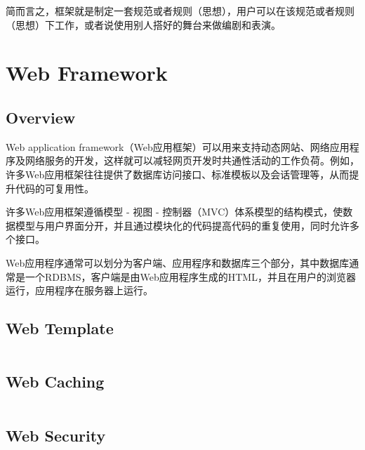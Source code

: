 简而言之，框架就是制定一套规范或者规则（思想），用户可以在该规范或者规则（思想）下工作，或者说使用别人搭好的舞台来做编剧和表演。

\section{Web Framework}


\subsection{Overview}


Web application framework（Web应用框架）可以用来支持动态网站、网络应用程序及网络服务的开发，这样就可以减轻网页开发时共通性活动的工作负荷。例如，许多Web应用框架往往提供了数据库访问接口、标准模板以及会话管理等，从而提升代码的可复用性。

许多Web应用框架遵循模型 - 视图 - 控制器（MVC）体系模型的结构模式，使数据模型与用户界面分开，并且通过模块化的代码提高代码的重复使用，同时允许多个接口。

Web应用程序通常可以划分为客户端、应用程序和数据库三个部分，其中数据库通常是一个RDBMS，客户端是由Web应用程序生成的HTML，并且在用户的浏览器运行，应用程序在服务器上运行。

\subsection{Web Template}



\begin{lstlisting}[language=PHP]

\end{lstlisting}


\subsection{Web Caching}







\begin{lstlisting}[language=PHP]

\end{lstlisting}



\subsection{Web Security}





